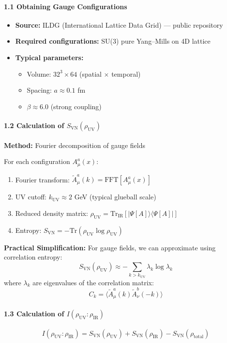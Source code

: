\documentclass[11pt]{article}
\theoremstyle{definition}
\theoremstyle{remark}
\begin{document}
\paragraph{1.1 Obtaining Gauge Configurations}
\begin{itemize}
\item \textbf{Source:} ILDG (International Lattice Data Grid) --- public repository
\item \textbf{Required configurations:} SU(3) pure Yang--Mills on 4D lattice
\item \textbf{Typical parameters:}
  \begin{itemize}
  \item Volume: $32^3 \times 64$ (spatial $\times$ temporal)
  \item Spacing: $a \approx 0.1$ fm
  \item $\beta \approx 6.0$ (strong coupling)
  \end{itemize}
\end{itemize}

\paragraph{1.2 Calculation of $S_{\text{VN}}(\rho_{\text{UV}})$}
\textbf{Method:} Fourier decomposition of gauge fields

For each configuration $A_\mu^a(x)$:
\begin{enumerate}
\item Fourier transform: $\tilde{A}_\mu^a(k) = \text{FFT}[A_\mu^a(x)]$
\item UV cutoff: $k_{\text{UV}} \approx 2$ GeV (typical glueball scale)
\item Reduced density matrix: $\rho_{\text{UV}} = \text{Tr}_{\text{IR}}[|\Psi[A]\rangle\langle\Psi[A]|]$
\item Entropy: $S_{\text{VN}} = -\text{Tr}(\rho_{\text{UV}} \log \rho_{\text{UV}})$
\end{enumerate}

\textbf{Practical Simplification:}
For gauge fields, we can approximate using correlation entropy:
\[
S_{\text{VN}}(\rho_{\text{UV}}) \approx -\sum_{k > k_{\text{UV}}} \lambda_k \log \lambda_k
\]
where $\lambda_k$ are eigenvalues of the correlation matrix:
\[
C_k = \langle \tilde{A}_\mu^a(k) \tilde{A}_\nu^b(-k) \rangle
\]

\paragraph{1.3 Calculation of $I(\rho_{\text{UV}} : \rho_{\text{IR}})$}
\[
I(\rho_{\text{UV}} : \rho_{\text{IR}}) = S_{\text{VN}}(\rho_{\text{UV}}) + S_{\text{VN}}(\rho_{\text{IR}}) - S_{\text{VN}}(\rho_{\text{total}})
\]
\end{document}
